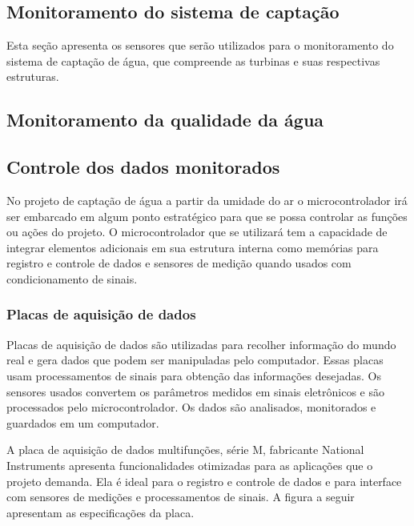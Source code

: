     \subsection{Monitoramento do sistema de captação}
      
      Esta seção apresenta os sensores que serão utilizados para o monitoramento do sistema de captação
      de água, que compreende as turbinas e suas respectivas estruturas.
      
      
      
      
      
    \subsection{Monitoramento da qualidade da água}
    
      
      
      
    
    \subsection{Controle dos dados monitorados}
    
      No projeto de captação de água a partir da umidade do ar o microcontrolador irá ser embarcado em algum ponto estratégico para que se possa controlar as funções ou ações do projeto. O microcontrolador que se utilizará tem a capacidade de integrar elementos adicionais em sua estrutura interna como memórias para registro e controle de dados e sensores de medição quando usados com condicionamento de sinais.
      
      \subsubsection{Placas de aquisição de dados}
      
	Placas de aquisição de dados são utilizadas para recolher informação do mundo real e gera dados que podem ser manipuladas pelo computador. Essas placas usam processamentos de sinais para obtenção das informações desejadas. Os sensores usados convertem os parâmetros medidos em sinais eletrônicos e são processados pelo microcontrolador. Os dados são analisados, monitorados e guardados em um computador. 
	
	A placa de aquisição de dados multifunções, série M, fabricante National Instruments apresenta funcionalidades otimizadas para as aplicações que o projeto demanda. Ela é ideal para o registro e controle de dados e para interface com sensores de medições e processamentos de sinais. A figura a seguir apresentam as especificações da placa.
	
